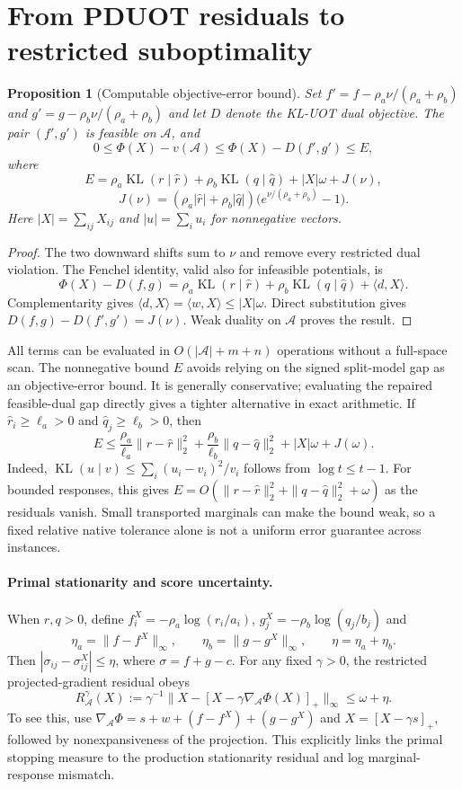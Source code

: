 \documentclass[11pt]{article}
\newtheorem{proposition}{Proposition}
\newcommand{\KL}{\operatorname{KL}}
\begin{document}
\section{From PDUOT residuals to restricted suboptimality}
\begin{proposition}[Computable objective-error bound]\label{prop:gap}
Set $f'=f-\rho_a\nu/(\rho_a+\rho_b)$ and $g'=g-\rho_b\nu/(\rho_a+\rho_b)$ and let $D$ denote the KL-UOT dual objective.
The pair $(f',g')$ is feasible on $\mathcal A$, and
$$0\leq\Phi(X)-v(\mathcal A)\leq\Phi(X)-D(f',g')\leq E,$$
where
$$E=\rho_a\KL(r\mid\widehat r)+\rho_b\KL(q\mid\widehat q)+|X|\omega+J(\nu),$$
$$J(\nu)=(\rho_a|\widehat r|+\rho_b|\widehat q|)\big(e^{\nu/(\rho_a+\rho_b)}-1\big).$$
Here $|X|=\sum_{ij}X_{ij}$ and $|u|=\sum_i u_i$ for nonnegative vectors.
\end{proposition}
\begin{proof}
The two downward shifts sum to $\nu$ and remove every restricted dual violation.
The Fenchel identity, valid also for infeasible potentials, is
$$\Phi(X)-D(f,g)=\rho_a\KL(r\mid\widehat r)+\rho_b\KL(q\mid\widehat q)+\langle d,X\rangle.$$
Complementarity gives $\langle d,X\rangle=\langle w,X\rangle\leq |X|\omega$.
Direct substitution gives $D(f,g)-D(f',g')=J(\nu)$.
Weak duality on $\mathcal A$ proves the result.
\end{proof}

All terms can be evaluated in $O(|\mathcal A|+m+n)$ operations without a full-space scan.
The nonnegative bound $E$ avoids relying on the signed split-model gap as an objective-error bound.
It is generally conservative; evaluating the repaired feasible-dual gap directly gives a tighter alternative in exact arithmetic.
If $\widehat r_i\geq\ell_a>0$ and $\widehat q_j\geq\ell_b>0$, then
$$E\leq\frac{\rho_a}{\ell_a}\|r-\widehat r\|_2^2+\frac{\rho_b}{\ell_b}\|q-\widehat q\|_2^2+|X|\omega+J(\omega).$$
Indeed, $\KL(u\mid v)\leq\sum_i(u_i-v_i)^2/v_i$ follows from $\log t\leq t-1$.
For bounded responses, this gives $E=O(\|r-\widehat r\|_2^2+\|q-\widehat q\|_2^2+\omega)$ as the residuals vanish.
Small transported marginals can make the bound weak, so a fixed relative native tolerance alone is not a uniform error guarantee across instances.

\paragraph{Primal stationarity and score uncertainty.}
When $r,q>0$, define $f_i^X=-\rho_a\log(r_i/a_i)$, $g_j^X=-\rho_b\log(q_j/b_j)$ and
$$\eta_a=\|f-f^X\|_\infty,\qquad\eta_b=\|g-g^X\|_\infty,\qquad\eta=\eta_a+\eta_b.$$
Then $|\sigma_{ij}-\sigma_{ij}^X|\leq\eta$, where $\sigma=f+g-c$.
For any fixed $\gamma>0$, the restricted projected-gradient residual obeys
$$R_{\mathcal A}^{\gamma}(X):=\gamma^{-1}\|X-[X-\gamma\nabla_{\mathcal A}\Phi(X)]_+\|_\infty\leq\omega+\eta.$$
To see this, use $\nabla_{\mathcal A}\Phi=s+w+(f-f^X)+(g-g^X)$ and $X=[X-\gamma s]_+$, followed by nonexpansiveness of the projection.
This explicitly links the primal stopping measure to the production stationarity residual and log marginal-response mismatch.
\end{document}
